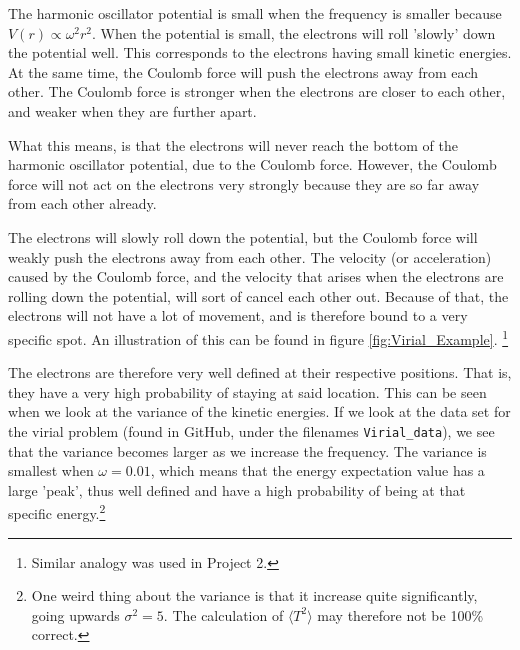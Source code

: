 \documentclass[12pt]{article}
\begin{document}
The harmonic oscillator potential is small when the frequency is smaller because $V(r) \propto \omega^2r^2$. When the potential is small, the electrons will roll 'slowly' down the potential well. This corresponds to the electrons having small kinetic energies. At the same time, the Coulomb force will push the electrons away from each other. The Coulomb force is stronger when the electrons are closer to each other, and weaker when they are further apart.

What this means, is that the electrons will never reach the bottom of the harmonic oscillator potential, due to the Coulomb force. However, the Coulomb force will not act on the electrons very strongly because they are so far away from each other already. 

The electrons will slowly roll down the potential, but the Coulomb force will weakly push the electrons away from each other. The velocity (or acceleration) caused by the Coulomb force, and the velocity that arises when the electrons are rolling down the potential, will sort of cancel each other out. Because of that, the electrons will not have a lot of movement, and is therefore bound to a very specific spot. An illustration of this can be found in figure \ref{fig:Virial_Example}. \footnote{Similar analogy was used in Project 2.}

The electrons are therefore very well defined at their respective positions. That is, they have a very high probability of staying at said location. This can be seen when we look at the variance of the kinetic energies. If we look at the data set for the virial problem (found in GitHub, under the filenames \texttt{Virial\_data}), we see that the variance becomes larger as we increase the frequency. The variance is smallest when $\omega = 0.01$, which means that the energy expectation value has a large 'peak', thus well defined and have a high probability of being at that specific energy.\footnote{One weird thing about the variance is that it increase quite significantly, going upwards $\sigma^2 = 5$. The calculation of $\langle T^2 \rangle$ may therefore not be 100\% correct.}
\end{document}
